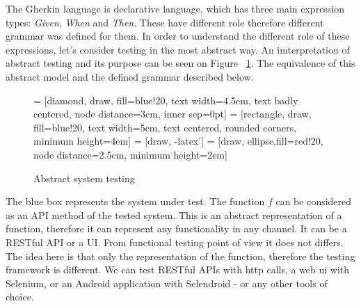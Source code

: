 \documentclass[conference]{IEEEtran}
\begin{document}
The Gherkin language is declarative language, which has three main expression types: \textit{Given}, \textit{When} and \textit{Then}. These have different role therefore different grammar was defined for them. In order to understand the different role of these expressions, let's consider testing in the most abstract way. An imterpretation of abstract testing and its purpose can be seen on Figure ~\ref{fig:absSysTest}. The equivalence of this abstract model and the defined grammar described below.

\begin{figure}[hbt!]
    \caption{Abstract system testing}
    \centering
    \label{fig:absSysTest}
  
     = [diamond, draw, fill=blue!20, text width=4.5em, text badly centered, node distance=3cm, inner sep=0pt]
     = [rectangle, draw, fill=blue!20, text width=5em, text centered, rounded corners, minimum height=4em]
     = [draw, -latex']
     = [draw, ellipse,fill=red!20, node distance=2.5cm, minimum height=2em]
    
\end{figure}

The blue box represents the system under test. The function \(f\) can be considered as an API method of the tested system. This is an abstract representation of a function, therefore it can represent any functionality in any channel. It can be a RESTful API or a UI. From functional testing point of view it does not differs. The idea here is that only the representation of the function, therefore the testing framework is different. We can test RESTful APIs with http calls, a web ui with Selenium, or an Android application with Selendroid - or any other tools of choice. 
\end{document}
